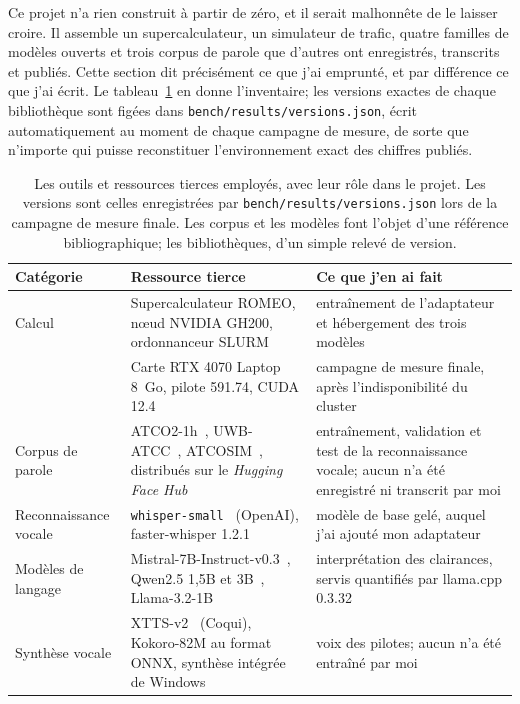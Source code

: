 \documentclass[11pt,a4paper]{article}
\begin{document}
Ce projet n'a rien construit à partir de zéro, et il serait malhonnête de le laisser croire. Il assemble un supercalculateur, un simulateur de trafic, quatre familles de modèles ouverts et trois corpus de parole que d'autres ont enregistrés, transcrits et publiés. Cette section dit précisément ce que j'ai emprunté, et par différence ce que j'ai écrit. Le tableau~\ref{tab:outils} en donne l'inventaire; les versions exactes de chaque bibliothèque sont figées dans \texttt{bench/results/versions.json}, écrit automatiquement au moment de chaque campagne de mesure, de sorte que n'importe qui puisse reconstituer l'environnement exact des chiffres publiés.

\begin{table}[!htbp]
\centering
\caption[Outils et ressources tierces employés]{Les outils et ressources tierces employés, avec leur rôle dans le projet.
Les versions sont celles enregistrées par \texttt{bench/results/versions.json} lors de la
campagne de mesure finale. Les corpus et les modèles font l'objet d'une référence
bibliographique; les bibliothèques, d'un simple relevé de version.}
\label{tab:outils}
\small
\begin{tabular}{>{\raggedright\arraybackslash}p{2.7cm} >{\raggedright\arraybackslash}p{5.5cm} >{\raggedright\arraybackslash}p{6.8cm}}
\toprule
\rowcolor{lightgray}\textbf{Catégorie} & \textbf{Ressource tierce} & \textbf{Ce que j'en ai fait}\\
\midrule
Calcul & Supercalculateur ROMEO, n\oe ud NVIDIA GH200, ordonnanceur SLURM & entraînement de l'adaptateur et hébergement des trois modèles\\
 & Carte RTX 4070 Laptop 8~Go, pilote 591.74, CUDA 12.4 & campagne de mesure finale, après l'indisponibilité du cluster\\
\midrule
Corpus de parole & ATCO2-1h~\cite{atco2}, UWB-ATCC~\cite{uwbatcc}, ATCOSIM~\cite{atcosim}, distribués sur le \emph{Hugging Face Hub} & entraînement, validation et test de la reconnaissance vocale; aucun n'a été enregistré ni transcrit par moi\\
\midrule
Reconnaissance vocale & \texttt{whisper-small}~\cite{whisper} (OpenAI), faster-whisper 1.2.1 & modèle de base gelé, auquel j'ai ajouté mon adaptateur\\
Modèles de langage & Mistral-7B-Instruct-v0.3~\cite{mistral}, Qwen2.5 1,5B et 3B~\cite{qwen}, Llama-3.2-1B & interprétation des clairances, servis quantifiés par llama.cpp 0.3.32\\
Synthèse vocale & XTTS-v2~\cite{xtts} (Coqui), Kokoro-82M au format ONNX, synthèse intégrée de Windows & voix des pilotes; aucun n'a été entraîné par moi\\

\end{tabular}
\end{table}
\end{document}
